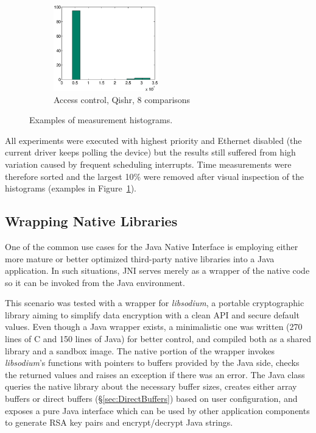 \documentclass[a4paper,12pt,twoside,openright]{report}
\newcommand{\tool}[1]{\emph{#1}}
\newcommand{\lib}[1]{\tool{lib#1}}
\begin{document}
\begin{figure}[t]
	\begin{subfigure}{0.90\textwidth}
		\centering
		\includegraphics[width=0.5\textwidth]{10_access.eps}
		\caption{Access control, Qishr, 8 comparisons}
	\end{subfigure}
	\caption{Examples of measurement histograms.}
	\label{fig:hist}
\end{figure}

All experiments were executed with highest priority and Ethernet disabled (the current driver keeps polling the device) but the results still suffered from high variation caused by frequent scheduling interrupts. Time measurements were therefore sorted and the largest 10\% were removed after visual inspection of the histograms (examples in Figure~\ref{fig:hist}). 

\subsection{Wrapping Native Libraries}

One of the common use cases for the Java Native Interface is employing either more mature or better optimized third-party native libraries into a Java application. In such situations, JNI serves merely as a wrapper of the native code so it can be invoked from the Java environment.

This scenario was tested with a wrapper for \lib{sodium}, a portable cryptographic library aiming to simplify data encryption with a clean API and secure default values. Even though a Java wrapper exists, a minimalistic one was written (270 lines of C and 150 lines of Java) for better control, and compiled both as a shared library and a sandbox image. The native portion of the wrapper invokes \lib{sodium}'s functions with pointers to buffers provided by the Java side, checks the returned values and raises an exception if there was an error. The Java class queries the native library about the necessary buffer sizes, creates either array buffers or direct buffers (\S\ref{sec:DirectBuffers}) based on user configuration, and exposes a pure Java interface which can be used by other application components to generate RSA key pairs and encrypt/decrypt Java strings. 
\end{document}
